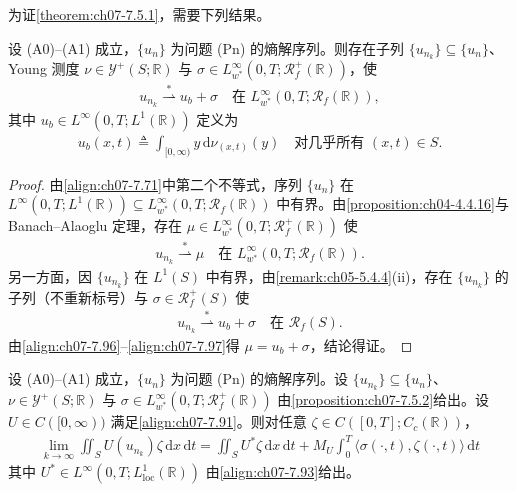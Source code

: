 \documentclass[../../main.tex]{subfiles}%
\begin{document}
为证\cref{theorem:ch07-7.5.1}，需要下列结果。

\begin{proposition}\label{proposition:ch07-7.5.2}
设 (A0)--(A1) 成立，$\{u_n\}$ 为问题 (Pn) 的熵解序列。则存在子列 $\{u_{n_k}\}\subseteq\{u_n\}$、Young 测度 $\nu\in\mathcal{Y}^+(S;\mathbb{R})$ 与 $\sigma\in L^\infty_{w^*}(0,T;\mathscr{R}_f^+(\mathbb{R}))$，使
\begin{align}
u_{n_k}\stackrel{*}{\rightharpoonup}u_b+\sigma\quad\text{在 }L^\infty_{w^*}(0,T;\mathscr{R}_f(\mathbb{R})), \label{align:ch07-7.94}
\end{align}
其中 $u_b\in L^\infty(0,T;L^1(\mathbb{R}))$ 定义为
\begin{align}
u_b(x,t)\triangleq \int_{[0,\infty)}y\,\mathrm{d}\nu_{(x,t)}(y)
\quad\text{对几乎所有 }(x,t)\in S. \label{align:ch07-7.95}
\end{align}
\end{proposition}

\begin{proof}
由\eqref{align:ch07-7.71}中第二个不等式，序列 $\{u_n\}$ 在 $L^\infty(0,T;L^1(\mathbb{R}))\subseteq L^\infty_{w^*}(0,T;\mathscr{R}_f(\mathbb{R}))$ 中有界。由\cref{proposition:ch04-4.4.16}与 Banach--Alaoglu 定理，存在 $\mu\in L^\infty_{w^*}(0,T;\mathscr{R}_f^+(\mathbb{R}))$ 使
\begin{align}
u_{n_k}\stackrel{*}{\rightharpoonup}\mu\quad\text{在 }L^\infty_{w^*}(0,T;\mathscr{R}_f(\mathbb{R})). \label{align:ch07-7.96}
\end{align}
另一方面，因 $\{u_{n_k}\}$ 在 $L^1(S)$ 中有界，由\cref{remark:ch05-5.4.4}(ii)，存在 $\{u_{n_k}\}$ 的子列（不重新标号）与 $\sigma\in\mathscr{R}_f^+(S)$ 使
\begin{align}
u_{n_k}\stackrel{*}{\rightharpoonup}u_b+\sigma\quad\text{在 }\mathscr{R}_f(S). \label{align:ch07-7.97}
\end{align}
由\eqref{align:ch07-7.96}--\eqref{align:ch07-7.97}得 $\mu=u_b+\sigma$，结论得证。
\end{proof}

\begin{proposition}\label{proposition:ch07-7.5.3}
设 (A0)--(A1) 成立，$\{u_n\}$ 为问题 (Pn) 的熵解序列。设 $\{u_{n_k}\}\subseteq\{u_n\}$、$\nu\in\mathcal{Y}^+(S;\mathbb{R})$ 与 $\sigma\in L^\infty_{w^*}(0,T;\mathscr{R}_f^+(\mathbb{R}))$ 由\cref{proposition:ch07-7.5.2}给出。设 $U\in C([0,\infty))$ 满足\eqref{align:ch07-7.91}。则对任意 $\zeta\in C([0,T];C_c(\mathbb{R}))$，
\begin{align}
\lim_{k\to\infty}\iint_S U(u_{n_k})\zeta\,\mathrm{d}x\,\mathrm{d}t
=\iint_S U^*\zeta\,\mathrm{d}x\,\mathrm{d}t+M_U\int_0^T\langle\sigma(\cdot,t),\zeta(\cdot,t)\rangle\,\mathrm{d}t \label{align:ch07-7.98}
\end{align}
其中 $U^*\in L^\infty(0,T;L^1_{\mathrm{loc}}(\mathbb{R}))$ 由\eqref{align:ch07-7.93}给出。
\end{proposition}
\end{document}
